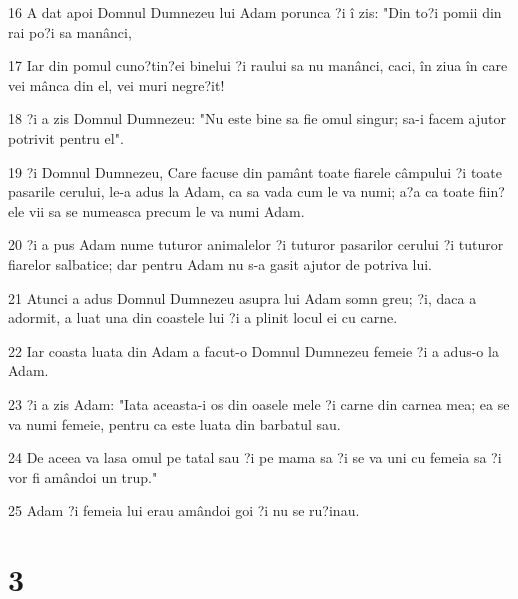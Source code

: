 \par 16 A dat apoi Domnul Dumnezeu lui Adam porunca ?i î zis: "Din to?i pomii din rai po?i sa manânci,
\par 17 Iar din pomul cuno?tin?ei binelui ?i raului sa nu manânci, caci, în ziua în care vei mânca din el, vei muri negre?it!
\par 18 ?i a zis Domnul Dumnezeu: "Nu este bine sa fie omul singur; sa-i facem ajutor potrivit pentru el".
\par 19 ?i Domnul Dumnezeu, Care facuse din pamânt toate fiarele câmpului ?i toate pasarile cerului, le-a adus la Adam, ca sa vada cum le va numi; a?a ca toate fiin?ele vii sa se numeasca precum le va numi Adam.
\par 20 ?i a pus Adam nume tuturor animalelor ?i tuturor pasarilor cerului ?i tuturor fiarelor salbatice; dar pentru Adam nu s-a gasit ajutor de potriva lui.
\par 21 Atunci a adus Domnul Dumnezeu asupra lui Adam somn greu; ?i, daca a adormit, a luat una din coastele lui ?i a plinit locul ei cu carne.
\par 22 Iar coasta luata din Adam a facut-o Domnul Dumnezeu femeie ?i a adus-o la Adam.
\par 23 ?i a zis Adam: "Iata aceasta-i os din oasele mele ?i carne din carnea mea; ea se va numi femeie, pentru ca este luata din barbatul sau.
\par 24 De aceea va lasa omul pe tatal sau ?i pe mama sa ?i se va uni cu femeia sa ?i vor fi amândoi un trup."
\par 25 Adam ?i femeia lui erau amândoi goi ?i nu se ru?inau.

\chapter{3}


